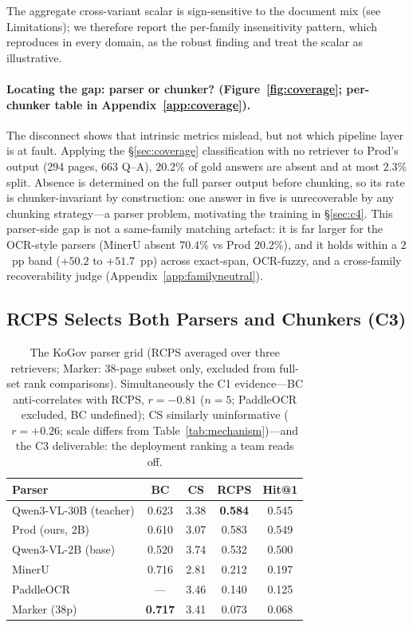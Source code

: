 \documentclass[11pt]{article}
\newcommand{\rcps}{\textsc{RCPS}}
\begin{document}
The aggregate cross-variant scalar is sign-sensitive to the document mix (see Limitations); we therefore report the per-family insensitivity pattern, which reproduces in every domain, as the robust finding and treat the scalar as illustrative.

\paragraph{Locating the gap: parser or chunker? (Figure~\ref{fig:coverage}; per-chunker table in Appendix~\ref{app:coverage}).} The disconnect shows that intrinsic metrics mislead, but not which pipeline layer is at fault. Applying the \S\ref{sec:coverage} classification with no retriever to Prod's output (294 pages, 663 Q--A), $20.2\%$ of gold answers are absent and at most $2.3\%$ split. Absence is determined on the full parser output before chunking, so its rate is chunker-invariant by construction: one answer in five is unrecoverable by any chunking strategy---a parser problem, motivating the training in \S\ref{sec:c4}. This parser-side gap is not a same-family matching artefact: it is far larger for the OCR-style parsers (MinerU absent $70.4\%$ vs Prod $20.2\%$), and it holds within a $2$~pp band ($+50.2$ to $+51.7$~pp) across exact-span, OCR-fuzzy, and a cross-family recoverability judge (Appendix~\ref{app:familyneutral}).

\subsection{\rcps{} Selects Both Parsers and Chunkers (C3)}
\label{sec:c3}

\begin{table}[t]
\centering\footnotesize
\setlength{\tabcolsep}{2.5pt}
\begin{tabular}{lcccc}
\toprule
Parser & BC & CS & \rcps{} & Hit@1 \\
\midrule
Qwen3-VL-30B (teacher) & 0.623 & 3.38 & \textbf{0.584} & 0.545 \\
Prod (ours, 2B) & 0.610 & 3.07 & 0.583 & 0.549 \\
Qwen3-VL-2B (base) & 0.520 & 3.74 & 0.532 & 0.500 \\
MinerU & 0.716 & 2.81 & 0.212 & 0.197 \\
PaddleOCR & --- & 3.46 & 0.140 & 0.125 \\
Marker (38p) & \textbf{0.717} & 3.41 & 0.073 & 0.068 \\
\bottomrule
\end{tabular}
\caption{The KoGov parser grid (\rcps{} averaged over three retrievers; Marker: 38-page subset only, excluded from full-set rank comparisons). Simultaneously the C1 evidence---BC anti-correlates with \rcps{}, $r = -0.81$ ($n = 5$; PaddleOCR excluded, BC undefined); CS similarly uninformative ($r = +0.26$; scale differs from Table~\ref{tab:mechanism})---and the C3 deliverable: the deployment ranking a team reads off.}
\label{tab:grid}
\end{table}
\end{document}
